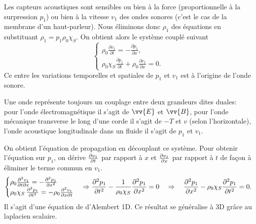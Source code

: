 \documentclass[12pt,fancy]{cours}
\begin{document}
Les capteurs acoustiques sont sensibles ou bien à la force (proportionnelle à la surpression $p_1$) ou bien à la vitesse $v_1$ des ondes sonores (c'est le cas de la membrane d'un haut-parleur). Nous éliminons donc $\rho_1$ des équations en substituant $\rho_1=p_1\rho_0\chi_S$. On obtient alors le système couplé suivant
\begin{equation}
\label{eq:syst_couplé}
  \begin{cases}
  \rho_0\frac{\partial v_1}{\partial t}=-\frac{\partial p_1}{\partial x},\\
    \rho_0\chi_S\frac{\partial p_1}{\partial t}+\rho_0 \frac{\partial v_1}{\partial x}=0.
  \end{cases}
  \end{equation}
  Ce  entre les variations temporelles et spatiales de $p_1$ et $v_1$ est à l'origine de l'onde sonore.
\begin{remarque}
Une onde représente toujours un couplage entre deux grandeurs dites duales: pour l'onde électromagnétique il s'agit de $\vv{E}$ et $\vv{B}$, pour l'onde mécanique transverse le long d'une corde il s'agit de $-T$ et $v$ (selon l'horizontale), l'onde acoustique longitudinale dans un fluide il s'agit de $p_1$ et $v_1$.
\end{remarque}

  On obtient l'équation de propagation en découplant ce système. Pour obtenir l'équation sur $p_1$, on dérive $\frac{\partial{v_1}}{\partial{t}}$ par rapport à $x$ et $\frac{\partial{v_1}}{\partial{x}}$   par rapport à $t$ de façon à éliminer le terme commun en $v_1$.
  \begin{equation}
  \begin{cases}
  \rho_0\frac{\partial^2{v_1}}{\partial{t}\partial{x}}=-\frac{\partial^2{p_1}}{\partial{x}^2}\\
    \rho_0\chi_S\,\frac{\partial^2{p_1}}{\partial{t}^2} = -\rho_0\frac{\partial^2{v_1}}{\partial{x}\partial{t}}
  \end{cases}
	\Rightarrow
\frac{\partial^2{p_1}}{\partial{t}^2}-\frac{1}{\rho_0\chi_S}\frac{\partial^2{p_1}}{\partial{x}^2}= 0 \quad \Rightarrow \quad \frac{\partial^2{p_1}}{\partial{x}^2} -\rho_0\chi_S\frac{\partial^2{p_1}}{\partial{t}^2}=0.
\end{equation}
Il s'agit d'une équation de d'Alembert 1D. Ce résultat se généralise à 3D grâce au laplacien scalaire.
\end{document}
